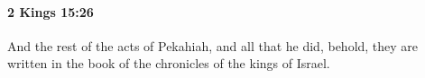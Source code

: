 
		\paragraph{2 Kings 15:26} %
			\label{2KINGS-15-26}

			And the rest of the acts of Pekahiah, and all that he did, behold, they are written in the book of the chronicles of the kings of Israel.


